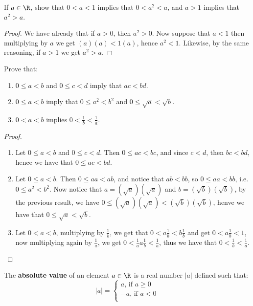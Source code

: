 \begin{example}
  If $a \in \R$, show that $0<a<1$ implies that $0<a^2<a$, and $a>1$ implies that $a^2>a$.
\end{example}
\begin{proof}
  We have already that if $a>0$, then $a^2>0$. Now suppose that $a<1$ then multiplying by $a$ we get $(a)(a)<1(a)$, hence 
  $a^2<1$. Likewise, by the same reasoning, if $a>1$ we get $a^2>a$.
\end{proof}

\begin{example}
  Prove that:
    \begin{enumerate}[label=(\arabic*)]
      \item $0 \leq a < b$ and $0 \leq c < d$ imply that $ac<bd$.

      \item $0 \leq a < b$ imply that $0 \leq a^2 < b^2$ and $0 \leq \sqrt{a} < \sqrt{b}$.

      \item $0<a<b$ implies $0<\frac{1}{b}<\frac{1}{a}$.
    \end{enumerate}
\end{example}
\begin{proof}
  \begin{enumerate}[label=(\arabic*)]
    \item Let $0 \leq a <b$ and $0 \leq c < d$. Then $0 \leq ac <bc$, and since $c<d$, then $bc<bd$, hence we have that $0 \leq ac < bd$.

    \item Let $0 \leq a < b$. Then $0 \leq aa < ab$, and notice that $ab<bb$, so $0 \leq aa < bb$, i.e. $0 \leq a^2 < b^2$. 
        Now notice that $a=(\sqrt{a})(\sqrt{a})$ and $b=(\sqrt{b})(\sqrt{b})$, by the previous result, we have $0 \leq (\sqrt{a})(\sqrt{a}) < (\sqrt{b})(\sqrt{b})$, henve we have that $0 \leq \sqrt{a} < \sqrt{b}$.

    \item Let $0<a<b$, multiplying by $\frac{1}{b}$, we get that $0<a\frac{1}{b}<b\frac{1}{b}$ and get $0<a\frac{1}{b}<1$, 
        now multiplying again by $\frac{1}{a}$, we get $0<\frac{1}{a}a\frac{1}{b}<\frac{1}{a}$, thus we have that $0<\frac{1}{b}<\frac{1}{a}$.
  \end{enumerate}
\end{proof}

\begin{definition}
   The \textbf{absolute value} of an element $a \in \R$ is a real number $|a|$ defined such that:
   \begin{equation}
     |a|=
        \begin{cases}
          a \text{, if } a \geq 0 \\
          -a \text{, if } a<0 \\
        \end{cases}
   \end{equation}
\end{definition}

